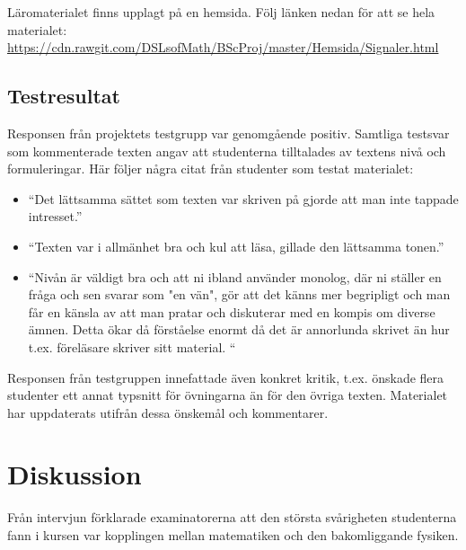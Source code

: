 \documentclass[]{article}
\begin{document}
Läromaterialet finns upplagt på en hemsida. Följ länken nedan för att se hela materialet:
\url{https://cdn.rawgit.com/DSLsofMath/BScProj/master/Hemsida/Signaler.html}

\subsection{Testresultat}
Responsen från projektets testgrupp var genomgående positiv. Samtliga testsvar som kommenterade texten angav att 
studenterna tilltalades av textens nivå och formuleringar. Här följer några citat från studenter som testat materialet:
\begin{itemize}
  \item “Det lättsamma sättet som texten var skriven på gjorde att man inte tappade intresset.”
  \item “Texten var i allmänhet bra och kul att läsa, gillade den lättsamma tonen.”
  \item “Nivån är väldigt bra och att ni ibland använder monolog, där ni ställer en fråga och sen svarar som "en vän", 
  gör att det känns mer begripligt och man får en känsla av att man pratar och diskuterar med en kompis om diverse ämnen.
  Detta ökar då förståelse enormt då det är annorlunda skrivet än hur t.ex. föreläsare skriver sitt material. “
\end{itemize}

Responsen från testgruppen innefattade även konkret kritik, t.ex. önskade flera studenter ett annat typsnitt för 
övningarna än för den övriga texten. Materialet har uppdaterats utifrån dessa önskemål och kommentarer.

\section{Diskussion}




Från intervjun förklarade examinatorerna att den största svårigheten studenterna
fann i kursen var kopplingen mellan matematiken och den bakomliggande fysiken.
\end{document}
